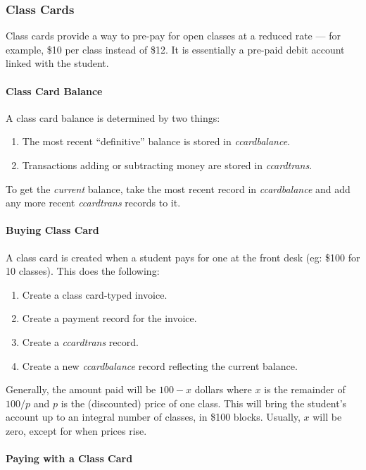 \documentclass[11pt]{article}
\begin{document}
\subsubsection{Class Cards}

Class cards provide a way to pre-pay for open classes at a reduced rate --- for example, \$10 per class instead of \$12.  It is essentially a pre-paid debit account linked with the student.

\paragraph{Class Card Balance}

A class card balance is determined by two things:
 \begin{enumerate}
 \item The most recent ``definitive'' balance is stored in \emph{ccardbalance}.
 \item Transactions adding or subtracting money are stored in \emph{ccardtrans}. \end{enumerate}

To get the \emph{current} balance, take the most recent record in \emph{ccardbalance} and add any more recent \emph{ccardtrans} records to it.

\paragraph{Buying Class Card}

A class card is created when a student pays for one at the front desk (eg: \$100 for 10 classes).  This does the following:
 \begin{enumerate}
 \item Create a class card-typed invoice.
 \item Create a payment record for the invoice.
 \item Create a \emph{ccardtrans} record.
 \item Create a new \emph{ccardbalance} record reflecting the current balance.
 \end{enumerate}

Generally, the amount paid will be $100-x$ dollars where $x$ is the remainder of $100 / p$ and $p$ is the (discounted) price of one class.  This will bring the student's account up to an integral number of classes, in \$100 blocks.  Usually, $x$ will be zero, except for when prices rise.

\paragraph{Paying with a Class Card}
\end{document}
